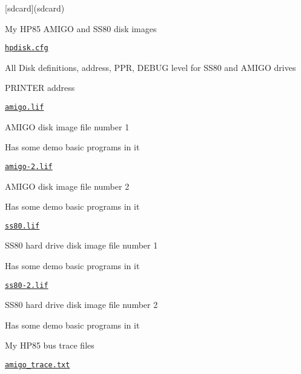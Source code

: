 \begin{DoxyItemize}
\item \mbox{[}sdcard\mbox{]}(sdcard)
\begin{DoxyItemize}
\item My H\+P85 A\+M\+I\+GO and S\+S80 disk images
\begin{DoxyItemize}
\item \href{sdcard/hpdisk.cfg}{\tt hpdisk.\+cfg}
\begin{DoxyItemize}
\item All Disk definitions, address, P\+PR, D\+E\+B\+UG level for S\+S80 and A\+M\+I\+GO drives
\item P\+R\+I\+N\+T\+ER address
\end{DoxyItemize}
\item \href{sdcard/amigo.lif}{\tt amigo.\+lif}
\begin{DoxyItemize}
\item A\+M\+I\+GO disk image file number 1
\item Has some demo basic programs in it
\end{DoxyItemize}
\item \href{sdcard/amigo-2.lif}{\tt amigo-\/2.\+lif}
\begin{DoxyItemize}
\item A\+M\+I\+GO disk image file number 2
\item Has some demo basic programs in it
\end{DoxyItemize}
\item \href{sdcard/ss80.lif}{\tt ss80.\+lif}
\begin{DoxyItemize}
\item S\+S80 hard drive disk image file number 1
\item Has some demo basic programs in it
\end{DoxyItemize}
\item \href{sdcard/ss80-2.lif}{\tt ss80-\/2.\+lif}
\begin{DoxyItemize}
\item S\+S80 hard drive disk image file number 2
\item Has some demo basic programs in it
\end{DoxyItemize}
\end{DoxyItemize}
\item My H\+P85 bus trace files
\begin{DoxyItemize}
\item \href{sdcard/amigo_trace.txt}{\tt amigo\+\_\+trace.\+txt}
\begin{DoxyItemize}

\end{DoxyItemize}
\end{DoxyItemize}
\end{DoxyItemize}
\end{DoxyItemize}
